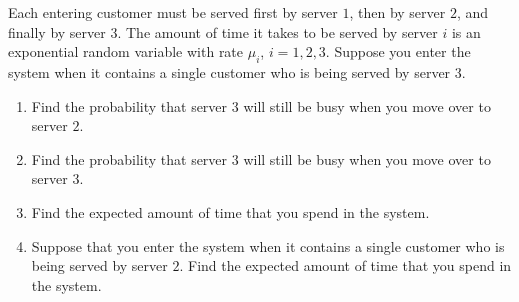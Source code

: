 
\begin{exercise}
\label{ex:counting-processes-26}
Each entering customer must be served first by server $1$, then by server $2$, and finally by server $3$. The amount of time it takes to be served by server $i$ is an exponential random variable with rate $\mu_i$, $i=1,2,3$. Suppose you enter the system when it contains a single customer who is being served by server $3$.
\begin{enumerate}
\item Find the probability that server $3$ will still be busy when you move over to server $2$.
\item Find the probability that server $3$ will still be busy when you move over to server $3$.
\item Find the expected amount of time that you spend in the system.
\item Suppose that you enter the system when it contains a single customer who is being served by server $2$. Find the expected amount of time that you spend in the system.
\end{enumerate}
\end{exercise}

